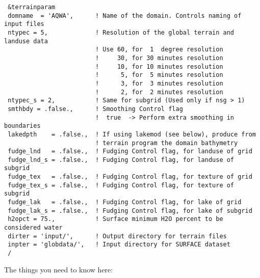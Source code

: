 {\footnotesize
\begin{Verbatim}
 &terrainparam
 domname  = 'AQWA',      ! Name of the domain. Controls naming of input files
 ntypec = 5,             ! Resolution of the global terrain and landuse data
                         ! Use 60, for  1  degree resolution
                         !     30, for 30 minutes resolution
                         !     10, for 10 minutes resolution
                         !      5, for  5 minutes resolution
                         !      3, for  3 minutes resolution
                         !      2, for  2 minutes resolution
 ntypec_s = 2,           ! Same for subgrid (Used only if nsg > 1)
 smthbdy = .false.,      ! Smoothing Control flag
                         !  true  -> Perform extra smoothing in boundaries
 lakedpth    = .false.,  ! If using lakemod (see below), produce from
                         ! terrain program the domain bathymetry
 fudge_lnd   = .false.,  ! Fudging Control flag, for landuse of grid
 fudge_lnd_s = .false.,  ! Fudging Control flag, for landuse of subgrid
 fudge_tex   = .false.,  ! Fudging Control flag, for texture of grid
 fudge_tex_s = .false.,  ! Fudging Control flag, for texture of subgrid
 fudge_lak   = .false.,  ! Fudging Control flag, for lake of grid
 fudge_lak_s = .false.,  ! Fudging Control flag, for lake of subgrid
 h2opct = 75.,           ! Surface minimum H2O percent to be considered water
 dirter = 'input/',      ! Output directory for terrain files
 inpter = 'globdata/',   ! Input directory for SURFACE dataset
 /
\end{Verbatim}
}

The things you need to know here:

